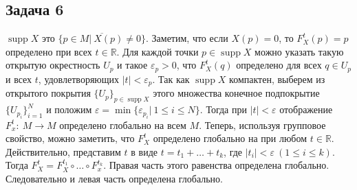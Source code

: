 \subsection*{Задача 6}
	$\operatorname{supp} X$ это $\overline{\{p \in M|\ X(p) \ne 0\}}$. Заметим, что если $X(p) = 0$, то $F_X^{t}(p) = p$ определено при всех $t \in \mathbb{R}$. Для каждой точки $p \in \operatorname{supp} X$ можно указать такую открытую окрестность $U_p$ и такое $\varepsilon_p > 0$, что $F_X^{t}(q)$ определено для всех $q \in U_p$ и всех $t$, удовлетворяющих $|t| < \varepsilon_p$. Так как $\operatorname{supp} X$ компактен, выберем из открытого покрытия $\{U_p\}_{p \in \operatorname{supp}X}$ этого множества конечное подпокрытие $\{U_{p_i}\}_{i = 1}^ {N}$ и положим $\varepsilon = \min\{\varepsilon_{p_i}|\ 1\leqslant i \leqslant N\}$. Тогда при $|t| < \varepsilon$ отображение $F_x^t:\ M \to M$ определено глобально на всем $M$. Теперь, используя групповое свойство, можно заметить, что $F_X^{t}$ определено глобально на при любом $t \in \mathbb{R}$. Действительно, представим $t$ в виде $t = t_1 + \ldots + t_k$, где $|t_i| < \varepsilon\ (1 \leqslant i \leqslant k)$. Тогда $F_X^t = F_X^{t_1} \circ \ldots \circ F_x^{t_k}$. Правая часть этого равенства определена глобально. Следовательно и левая часть определена глобально.
\vskip0.5in
\begin{comment}
	$\operatorname{supp} X$ это $\overline{\{p \in M|\ X(p) \ne 0\}}$. Заметим, что для $x \in M\backslash C\quad X_t(X) = X\ \forall t$, пусть $p \in \operatorname{supp} X$. Тогда по теореме с лекции $\exists V_p \ni p$ и $\varepsilon_p > 0$, такое что $(t,p) \mapsto X_t(p)$\\
	Из открытого покрытия $\operatorname{supp} X\quad \{V_p\}\ p \in \operatorname{supp} X$ выберем конечное подпокрытие $\{V_p\}_{p=1}^{N}$. Тогда взяв $\varepsilon = \min\limits_{p = 1,\ldots,N} \{\varepsilon_p\}$, получим
	\begin{gather*}
	\forall q \in M\ X_t: M \to M\quad \text{определен } \forall t \in (-\varepsilon, \varepsilon)
	\end{gather*}
	Из этого следует глобальная определенность (то есть для всей переменной)
	\begin{gather*}
	\forall t \in \mathbb{R}\ \forall q \in M\quad
	X_t = X_{t_1} \circ X_{t_2} \circ \ldots \circ X_{t_k}(q)\quad 
	t = t_1 + \ldots t_k\quad |t_i| < \varepsilon
	\end{gather*}
\end{comment}



